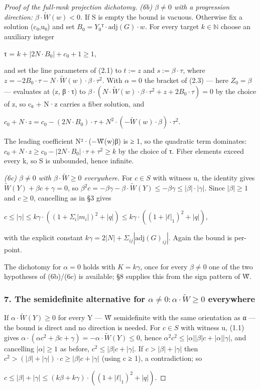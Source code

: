 \begin{proof}[Proof of the full-rank projection dichotomy]
\emph{(6b) $β ≠ 0$ with a progression direction: $β·\tilde{W}(w) < 0$.} If S is empty the bound is vacuous. Otherwise fix a solution (c₀,u₀) and set $B_{0} = Y_{0}ᵀ·\mathrm{adj}(G)·w$. For every target $k ∈ ℕ$ choose an auxiliary integer

τ = $k + |2N·B_{0}| + c_{0} + 1 ≥ 1$,

and set the line parameters of (2.1) to $t := z$ and $s := β·τ$, where $z = −2B_{0}·τ − N·\tilde{W}(w)·β·τ^{2}$. With $α = 0$ the bracket of (2.3) — here $Z_{0} = β$ — evaluates at (z, β·τ) to $β·(N·\tilde{W}(w)·β·τ^{2} + z + 2B_{0}·τ) = 0$ by the choice of z, so c₀ + N·z carries a fiber solution, and

$c_{0} + N·z = c_{0} − (2N·B_{0})·τ + N^{2}·(−\tilde{W}(w)·β)·τ^{2}$.

The leading coefficient N²·(−W̃(w)β) is ≥ 1, so the quadratic term dominates: $c_{0} + N·z ≥ c_{0} − |2N·B_{0}|·τ + τ^{2} ≥ k$ by the choice of τ. Fiber elements exceed every k, so S is unbounded, hence infinite.

\emph{(6c) $β ≠ 0$ with $β·\tilde{W} ≥ 0$ everywhere.} For $c ∈ S$ with witness u, the identity gives $\tilde{W}(Y) + βc + γ = 0$, so $β^{2}c = −βγ − β·\tilde{W}(Y) ≤ −βγ ≤ |β|·|γ|$. Since $|β| ≥ 1$ and $c ≥ 0$, cancelling as in §3 gives

$c ≤ |γ| ≤ kγ·((1+Σ_{i}|m_{i}|)^{2}+|q|) ≤ kγ·((1+|ℓ|_{1})^{2}+|q|)$,

with the explicit constant $kγ = 2|N| + Σ_{ij}|\mathrm{adj}(G)_{ij}|$. Again the bound is per-point.

The dichotomy for $α = 0$ holds with $K = kγ$, once for every $β ≠ 0$ one of the two hypotheses of (6b)/(6c) is available; §8 supplies this from the sign pattern of W̃.

\subsubsection*{7. The semidefinite alternative for $α ≠ 0: α·\tilde{W} ≥ 0$ everywhere}
If $α·\tilde{W}(Y) ≥ 0$ for every Y — W̃ semidefinite with the same orientation as α — the bound is direct and no direction is needed. For $c ∈ S$ with witness u, (1.1) gives $α·(αc^{2} + βc + γ) = −α·\tilde{W}(Y) ≤ 0$, hence $α^{2}c^{2} ≤ |α||β|c + |α||γ|$, and cancelling $|α| ≥ 1$ as before, $c^{2} ≤ |β|c + |γ|$. If $c > |β| + |γ|$ then $c^{2} > (|β|+|γ|)·c ≥ |β|c + |γ|$ (using c ≥ 1), a contradiction; so

$c ≤ |β| + |γ| ≤ (kβ + kγ)·((1+|ℓ|_{1})^{2}+|q|)$.


\end{proof}
